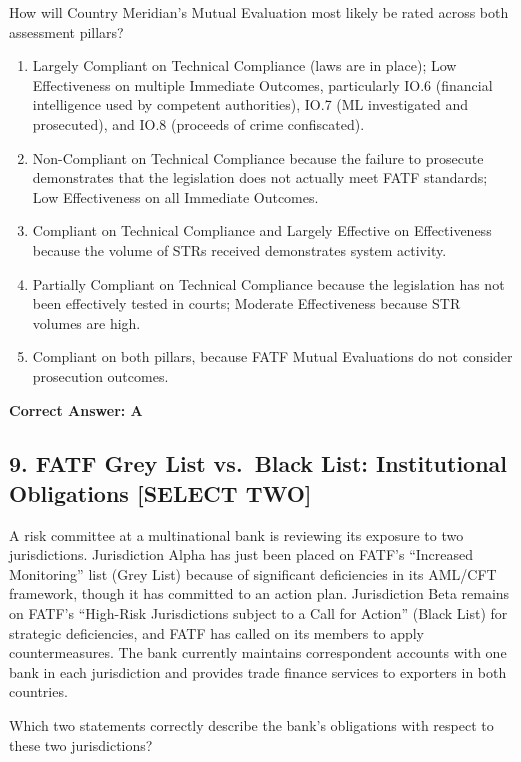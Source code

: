 \documentclass[11pt,a4paper]{article}
\begin{document}
	How will Country Meridian's Mutual Evaluation most likely be rated across both assessment pillars?
	
	\begin{enumerate}[label=\Alph*.]
		\item Largely Compliant on Technical Compliance (laws are in place); Low Effectiveness on multiple Immediate Outcomes, particularly IO.6 (financial intelligence used by competent authorities), IO.7 (ML investigated and prosecuted), and IO.8 (proceeds of crime confiscated).
		\item Non-Compliant on Technical Compliance because the failure to prosecute demonstrates that the legislation does not actually meet FATF standards; Low Effectiveness on all Immediate Outcomes.
		\item Compliant on Technical Compliance and Largely Effective on Effectiveness because the volume of STRs received demonstrates system activity.
		\item Partially Compliant on Technical Compliance because the legislation has not been effectively tested in courts; Moderate Effectiveness because STR volumes are high.
		\item Compliant on both pillars, because FATF Mutual Evaluations do not consider prosecution outcomes.
	\end{enumerate}
	\textbf{Correct Answer: A}
	
	\subsection{9. FATF Grey List vs.\ Black List: Institutional Obligations \textnormal{[SELECT TWO]}}
	
	A risk committee at a multinational bank is reviewing its exposure to two jurisdictions. Jurisdiction Alpha has just been placed on FATF's ``Increased Monitoring'' list (Grey List) because of significant deficiencies in its AML/CFT framework, though it has committed to an action plan. Jurisdiction Beta remains on FATF's ``High-Risk Jurisdictions subject to a Call for Action'' (Black List) for strategic deficiencies, and FATF has called on its members to apply countermeasures. The bank currently maintains correspondent accounts with one bank in each jurisdiction and provides trade finance services to exporters in both countries.
	
	Which two statements correctly describe the bank's obligations with respect to these two jurisdictions?
	
\end{document}
